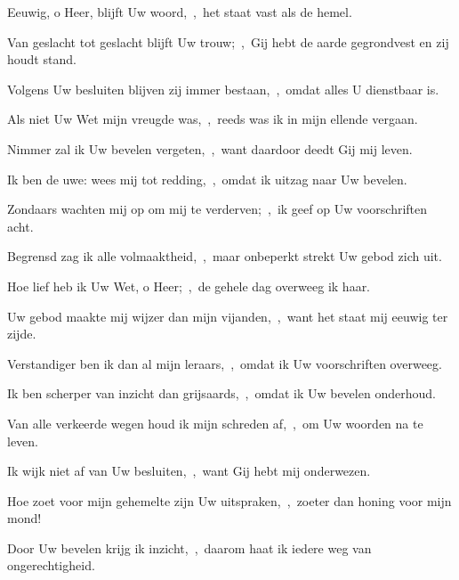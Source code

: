 \documentclass[12pt,twoside,a5paper]{article}
\begin{document}
\begin{halfparskip}
   

  Eeuwig, o Heer, blijft Uw woord,~\sep\ het staat vast als de hemel.


  Van geslacht tot geslacht blijft Uw trouw;~\sep\ Gij hebt de aarde gegrondvest en zij houdt stand.

  Volgens Uw besluiten blijven zij immer bestaan,~\sep\ omdat alles U dienstbaar is.

  Als niet Uw Wet mijn vreugde was,~\sep\ reeds was ik in mijn ellende vergaan.

  Nimmer zal ik Uw bevelen vergeten,~\sep\ want daardoor deedt Gij mij leven.

  Ik ben de uwe: wees mij tot redding,~\sep\ omdat ik uitzag naar Uw bevelen.

  Zondaars wachten mij op om mij te verderven;~\sep\ ik geef op Uw voorschriften acht.

  Begrensd zag ik alle volmaaktheid,~\sep\ maar onbeperkt strekt Uw gebod zich uit.

  Hoe lief heb ik Uw Wet, o Heer;~\sep\ de gehele dag overweeg ik haar.

  Uw gebod maakte mij wijzer dan mijn vijanden,~\sep\ want het staat mij eeuwig ter zijde.

  Verstandiger ben ik dan al mijn leraars,~\sep\ omdat ik Uw voorschriften overweeg.

  Ik ben scherper van inzicht dan grijsaards,~\sep\ omdat ik Uw bevelen onderhoud.

  Van alle verkeerde wegen houd ik mijn schreden af,~\sep\ om Uw woorden na te leven.

  Ik wijk niet af van Uw besluiten,~\sep\ want Gij hebt mij onderwezen.

  Hoe zoet voor mijn gehemelte zijn Uw uitspraken,~\sep\ zoeter dan honing voor mijn mond!

  Door Uw bevelen krijg ik inzicht,~\sep\ daarom haat ik iedere weg van ongerechtigheid.
\end{halfparskip}
\end{document}
